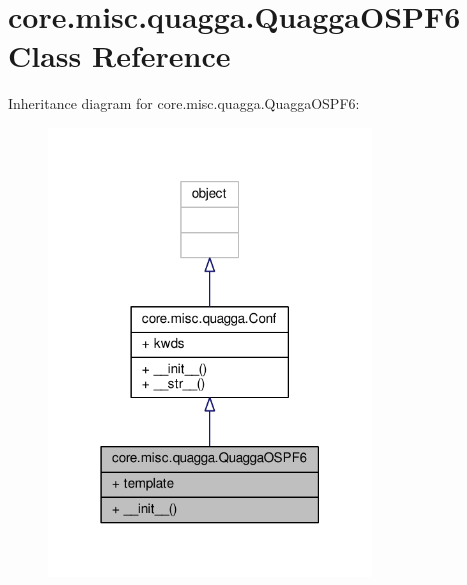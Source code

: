 \hypertarget{classcore_1_1misc_1_1quagga_1_1_quagga_o_s_p_f6}{\section{core.\+misc.\+quagga.\+Quagga\+O\+S\+P\+F6 Class Reference}
\label{classcore_1_1misc_1_1quagga_1_1_quagga_o_s_p_f6}
}


Inheritance diagram for core.\+misc.\+quagga.\+Quagga\+O\+S\+P\+F6\+:
\nopagebreak
\begin{figure}[H]
\begin{center}
\leavevmode
\includegraphics[width=243pt]{classcore_1_1misc_1_1quagga_1_1_quagga_o_s_p_f6__inherit__graph}
\end{center}
\end{figure}


